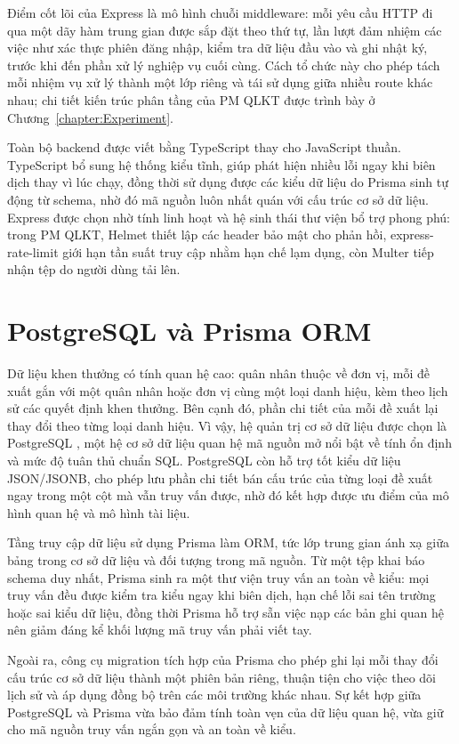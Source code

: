 \documentclass[../DoAn.tex]{subfiles}
\begin{document}
Điểm cốt lõi của Express là mô hình chuỗi middleware: mỗi yêu cầu HTTP đi qua một dãy hàm trung gian được sắp đặt theo thứ tự, lần lượt đảm nhiệm các việc như xác thực phiên đăng nhập, kiểm tra dữ liệu đầu vào và ghi nhật ký, trước khi đến phần xử lý nghiệp vụ cuối cùng. Cách tổ chức này cho phép tách mỗi nhiệm vụ xử lý thành một lớp riêng và tái sử dụng giữa nhiều route khác nhau; chi tiết kiến trúc phân tầng của PM QLKT được trình bày ở Chương~\ref{chapter:Experiment}.

Toàn bộ backend được viết bằng TypeScript \cite{typescript} thay cho JavaScript thuần. TypeScript bổ sung hệ thống kiểu tĩnh, giúp phát hiện nhiều lỗi ngay khi biên dịch thay vì lúc chạy, đồng thời sử dụng được các kiểu dữ liệu do Prisma sinh tự động từ schema, nhờ đó mã nguồn luôn nhất quán với cấu trúc cơ sở dữ liệu. Express được chọn nhờ tính linh hoạt và hệ sinh thái thư viện bổ trợ phong phú: trong PM QLKT, Helmet thiết lập các header bảo mật cho phản hồi, express-rate-limit giới hạn tần suất truy cập nhằm hạn chế lạm dụng, còn Multer tiếp nhận tệp do người dùng tải lên.

\section{PostgreSQL và Prisma ORM}
\label{section:3.3}

Dữ liệu khen thưởng có tính quan hệ cao: quân nhân thuộc về đơn vị, mỗi đề xuất gắn với một quân nhân hoặc đơn vị cùng một loại danh hiệu, kèm theo lịch sử các quyết định khen thưởng. Bên cạnh đó, phần chi tiết của mỗi đề xuất lại thay đổi theo từng loại danh hiệu. Vì vậy, hệ quản trị cơ sở dữ liệu được chọn là PostgreSQL \cite{postgresql}, một hệ cơ sở dữ liệu quan hệ mã nguồn mở nổi bật về tính ổn định và mức độ tuân thủ chuẩn SQL. PostgreSQL còn hỗ trợ tốt kiểu dữ liệu JSON/JSONB, cho phép lưu phần chi tiết bán cấu trúc của từng loại đề xuất ngay trong một cột mà vẫn truy vấn được, nhờ đó kết hợp được ưu điểm của mô hình quan hệ và mô hình tài liệu.

Tầng truy cập dữ liệu sử dụng Prisma \cite{prisma} làm ORM, tức lớp trung gian ánh xạ giữa bảng trong cơ sở dữ liệu và đối tượng trong mã nguồn. Từ một tệp khai báo schema duy nhất, Prisma sinh ra một thư viện truy vấn an toàn về kiểu: mọi truy vấn đều được kiểm tra kiểu ngay khi biên dịch, hạn chế lỗi sai tên trường hoặc sai kiểu dữ liệu, đồng thời Prisma hỗ trợ sẵn việc nạp các bản ghi quan hệ nên giảm đáng kể khối lượng mã truy vấn phải viết tay.

Ngoài ra, công cụ migration tích hợp của Prisma cho phép ghi lại mỗi thay đổi cấu trúc cơ sở dữ liệu thành một phiên bản riêng, thuận tiện cho việc theo dõi lịch sử và áp dụng đồng bộ trên các môi trường khác nhau. Sự kết hợp giữa PostgreSQL và Prisma vừa bảo đảm tính toàn vẹn của dữ liệu quan hệ, vừa giữ cho mã nguồn truy vấn ngắn gọn và an toàn về kiểu.
\end{document}

